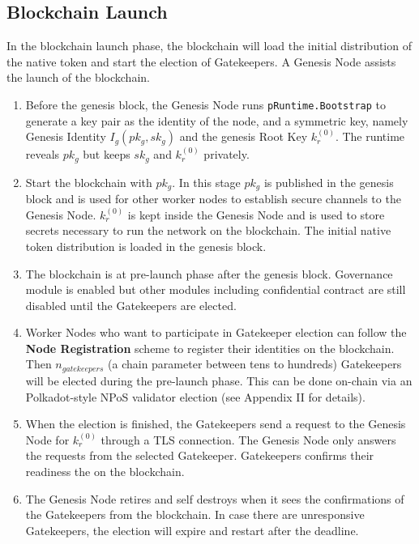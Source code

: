 \subsection{Blockchain Launch}

In the blockchain launch phase, the blockchain will load the initial distribution of the native token and start the election of Gatekeepers. A Genesis Node assists the launch of the blockchain.

\begin{enumerate}
    \item Before the genesis block, the Genesis Node runs \texttt{pRuntime.Bootstrap} to generate a key pair as the identity of the node, and a symmetric key, namely Genesis Identity $I_g(pk_g, sk_g)$ and the genesis Root Key $k_r^{(0)}$. The runtime reveals $pk_g$ but keeps $sk_g$ and $k_r^{(0)}$ privately.

    \item Start the blockchain with $pk_g$. In this stage $pk_g$ is published in the genesis block and is used for other worker nodes to establish secure channels to the Genesis Node. $k_r^{(0)}$ is kept inside the Genesis Node and is used to store secrets necessary to run the network on the blockchain. The initial native token distribution is loaded in the genesis block.

    \item The blockchain is at pre-launch phase after the genesis block. Governance module is enabled but other modules including confidential contract are still disabled until the Gatekeepers are elected.

    \item Worker Nodes who want to participate in Gatekeeper election can follow the \textbf{Node Registration} scheme to register their identities on the blockchain. Then $n_{gatekeepers}$ (a chain parameter between tens to hundreds) Gatekeepers will be elected during the pre-launch phase. This can be done on-chain via an Polkadot-style NPoS validator election (see Appendix II for details).

    \item When the election is finished, the Gatekeepers send a request to the Genesis Node for $k_r^{(0)}$ through a TLS connection. The Genesis Node only answers the requests from the selected Gatekeeper. Gatekeepers confirms their readiness the on the blockchain.

    \item The Genesis Node retires and self destroys when it sees the confirmations of the Gatekeepers from the blockchain. In case there are unresponsive Gatekeepers, the election will expire and restart after the deadline.
\end{enumerate}

